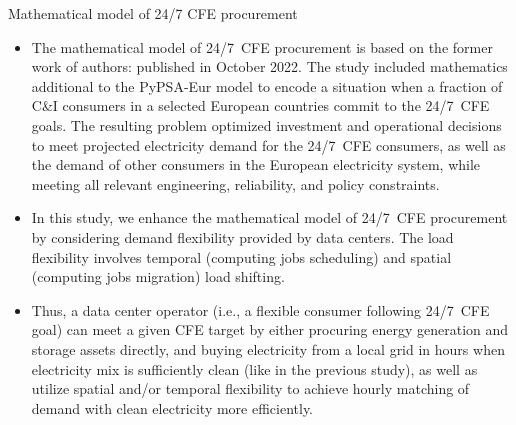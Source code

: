 \begin{frame}{Mathematical model of 24/7 CFE procurement}

  {\footnotesize
  \begin{itemize}
  \item The mathematical model of 24/7~CFE procurement is based on the former work of authors:  published in October 2022. The study included mathematics additional to the PyPSA-Eur model to encode a situation when a fraction of C\&I consumers in a selected European countries commit to the 24/7~CFE goals. The resulting problem optimized investment and operational decisions to meet projected electricity demand for the 24/7~CFE consumers, as well as the demand of other consumers in the European electricity system, while meeting all relevant engineering, reliability, and policy constraints.
  
  \item In this study, we enhance the mathematical model of 24/7~CFE procurement by considering demand flexibility provided by data centers. The load flexibility involves \alert{temporal} (computing jobs scheduling) and \alert{spatial} (computing jobs migration) load shifting. 

  \item Thus, a data center operator (i.e., a flexible consumer following 24/7~CFE goal) can meet a given CFE target by either procuring energy generation and storage assets directly, and buying electricity from a local grid in hours when electricity mix is sufficiently clean  (like in the previous study), as well as utilize spatial and/or temporal flexibility to achieve hourly matching of demand with clean electricity more efficiently.
  \end{itemize}
  }
\end{frame}



